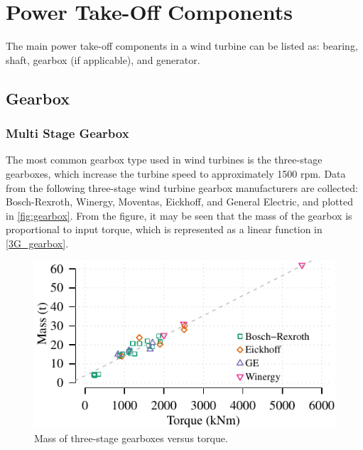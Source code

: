 \documentclass{article}\usepackage{graphicx, color}
\makeatletter
\def\maxwidth{ %
  \ifdim\Gin@nat@width>\linewidth
    \linewidth
  \else
    \Gin@nat@width
  \fi
}
\newenvironment{knitrout}{}{} %
\makeatother
\begin{document}
\section{Power Take-Off Components}

The main power take-off components in a wind turbine can be listed as: bearing, shaft, gearbox (if applicable), and generator. 

\subsection{Gearbox}

\subsubsection{Multi Stage Gearbox}

The most common gearbox type used in wind turbines is the three-stage gearboxes, which increase the turbine speed to approximately 1500 rpm. 
Data from the following three-stage wind turbine gearbox manufacturers are collected: Bosch-Rexroth\cite{bosch}, Winergy\cite{winergy}, Moventas\cite{Moventas}, Eickhoff\cite{eickhoff}, and General Electric\cite{GE}, and plotted in \autoref{fig:gearbox}. From the figure, it may be seen that the mass of the gearbox is proportional to input torque, which is represented as a linear function in \autoref{3G_gearbox}. 

\begin{knitrout}
\color{fgcolor}\begin{figure}[]

\includegraphics[width=\maxwidth]{figure/gearbox} \caption[Mass of three-stage gearboxes versus torque]{Mass of three-stage gearboxes versus torque.\label{fig:gearbox}}
\end{figure}


\end{knitrout}
\end{document}
